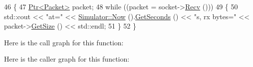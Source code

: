 \begin{DoxyCode}
46 \{
47   \hyperlink{classns3_1_1Ptr}{Ptr<Packet>} packet;
48   \textcolor{keywordflow}{while} ((packet = socket->\hyperlink{classns3_1_1Socket_a8949b1f844aae563446f2f4c5be8827a}{Recv} ()))
49     \{ 
50       std::cout << \textcolor{stringliteral}{"at="} << \hyperlink{group__simulator_gac3635e2e87f7ce316c89290ee1b01d0d}{Simulator::Now} ().\hyperlink{classns3_1_1Time_a8f20d5c3b0902d7b4320982f340b57c8}{GetSeconds} () << \textcolor{stringliteral}{"s, rx bytes="} << 
      packet->\hyperlink{classns3_1_1Packet_a462855c9929954d4301a4edfe55f4f1c}{GetSize} () << std::endl;
51     \}
52 \}
\end{DoxyCode}


Here is the call graph for this function\+:




Here is the caller graph for this function\+:


